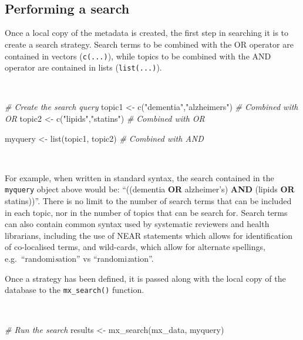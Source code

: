 \documentclass[a4paper, twoside]{templates/ociamthesis}
\newenvironment{Shaded}{\begin{snugshade}}{\end{snugshade}}
\newcommand{\CommentTok}[1]{\textcolor[rgb]{0.56,0.35,0.01}{\textit{#1}}}
\newcommand{\FunctionTok}[1]{\textcolor[rgb]{0.00,0.00,0.00}{#1}}
\newcommand{\NormalTok}[1]{#1}
\newcommand{\OtherTok}[1]{\textcolor[rgb]{0.56,0.35,0.01}{#1}}
\newcommand{\StringTok}[1]{\textcolor[rgb]{0.31,0.60,0.02}{#1}}
\renewenvironment{Shaded}
{
  \vspace{4pt}%
  \begin{snugshade}%
}{%
  \end{snugshade}%
  \vspace{4pt}%
}
\begin{document}
~

~

\hypertarget{performing-a-search}{%
\subsection{Performing a search}\label{performing-a-search}}

Once a local copy of the metadata is created, the first step in searching it is to create a search strategy. Search terms to be combined with the OR operator are contained in vectors (\texttt{c(...)}), while topics to be combined with the AND operator are contained in lists (\texttt{list(...)}).

~

\begin{Shaded}
\begin{Highlighting}[]
\CommentTok{\# Create the search query}
\NormalTok{topic1  }\OtherTok{\textless{}{-}} \FunctionTok{c}\NormalTok{(}\StringTok{"dementia"}\NormalTok{,}\StringTok{"alzheimer\textquotesingle{}s"}\NormalTok{)  }\CommentTok{\# Combined with OR}
\NormalTok{topic2  }\OtherTok{\textless{}{-}} \FunctionTok{c}\NormalTok{(}\StringTok{"lipids"}\NormalTok{,}\StringTok{"statins"}\NormalTok{)        }\CommentTok{\# Combined with OR}

\NormalTok{myquery }\OtherTok{\textless{}{-}} \FunctionTok{list}\NormalTok{(topic1, topic2)         }\CommentTok{\# Combined with AND}
\end{Highlighting}
\end{Shaded}

~

For example, when written in standard syntax, the search contained in the \texttt{myquery} object above would be: ``((dementia \textbf{OR} alzheimer's) \textbf{AND} (lipids \textbf{OR} statins))''. There is no limit to the number of search terms that can be included in each topic, nor in the number of topics that can be search for. Search terms can also contain common syntax used by systematic reviewers and health librarians, including the use of NEAR statements which allows for identification of co-localised terms, and wild-cards, which allow for alternate spellings, e.g.~``randomi\emph{s}ation'' vs ``randomi\emph{z}ation''.

Once a strategy has been defined, it is passed along with the local copy of the database to the \texttt{mx\_search()} function.

~

\begin{Shaded}
\begin{Highlighting}[]
\CommentTok{\# Run the search}
\NormalTok{results }\OtherTok{\textless{}{-}} \FunctionTok{mx\_search}\NormalTok{(mx\_data,}
\NormalTok{                     myquery)}
\end{Highlighting}
\end{Shaded}
\end{document}
